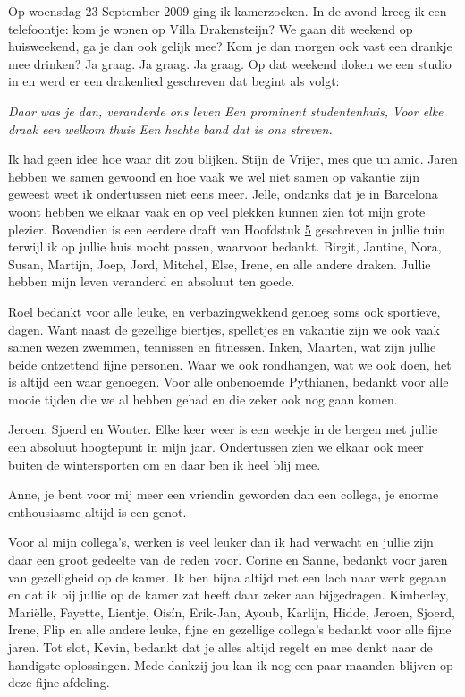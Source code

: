 \documentclass[openright,titlepage,12pt,a4paper]{book}
\begin{document}
\newpage

Op woensdag 23 September 2009 ging ik kamerzoeken. In de avond kreeg ik een telefoontje: kom je wonen op Villa Drakensteijn? We gaan dit weekend op huisweekend, ga je dan ook gelijk mee? Kom je dan morgen ook vast een drankje mee drinken? Ja graag. Ja graag. Ja graag. Op dat weekend doken we een studio in en werd er een drakenlied geschreven dat begint als volgt:

\emph{Daar was je dan, veranderde ons leven} \newline
\emph{Een prominent studentenhuis,} \newline
\emph{Voor elke draak een welkom thuis} \newline
\emph{Een hechte band dat is ons streven.}

Ik had geen idee hoe waar dit zou blijken. Stijn de Vrijer, mes que un amic. Jaren hebben we samen gewoond en hoe vaak we wel niet samen op vakantie zijn geweest weet ik ondertussen niet eens meer. Jelle, ondanks dat je in Barcelona woont hebben we elkaar vaak en op veel plekken kunnen zien tot mijn grote plezier. Bovendien is een eerdere draft van Hoofdstuk \protect\hyperlink{Burns}{5} geschreven in jullie tuin terwijl ik op jullie huis mocht passen, waarvoor bedankt. Birgit, Jantine, Nora, Susan, Martijn, Joep, Jord, Mitchel, Else, Irene, en alle andere draken. Jullie hebben mijn leven veranderd en absoluut ten goede.

Roel bedankt voor alle leuke, en verbazingwekkend genoeg soms ook sportieve, dagen. Want naast de gezellige biertjes, spelletjes en vakantie zijn we ook vaak samen wezen zwemmen, tennissen en fitnessen. Inken, Maarten, wat zijn jullie beide ontzettend fijne personen. Waar we ook rondhangen, wat we ook doen, het is altijd een waar genoegen. Voor alle onbenoemde Pythianen, bedankt voor alle mooie tijden die we al hebben gehad en die zeker ook nog gaan komen.

Jeroen, Sjoerd en Wouter. Elke keer weer is een weekje in de bergen met jullie een absoluut hoogtepunt in mijn jaar. Ondertussen zien we elkaar ook meer buiten de wintersporten om en daar ben ik heel blij mee.

Anne, je bent voor mij meer een vriendin geworden dan een collega, je enorme enthousiasme altijd is een genot.

Voor al mijn collega's, werken is veel leuker dan ik had verwacht en jullie zijn daar een groot gedeelte van de reden voor. Corine en Sanne, bedankt voor jaren van gezelligheid op de kamer. Ik ben bijna altijd met een lach naar werk gegaan en dat ik bij jullie op de kamer zat heeft daar zeker aan bijgedragen. Kimberley, Mariëlle, Fayette, Lientje, Oisín, Erik-Jan, Ayoub, Karlijn, Hidde, Jeroen, Sjoerd, Irene, Flip en alle andere leuke, fijne en gezellige collega's bedankt voor alle fijne jaren. Tot slot, Kevin, bedankt dat je alles altijd regelt en mee denkt naar de handigste oplossingen. Mede dankzij jou kan ik nog een paar maanden blijven op deze fijne afdeling.
\end{document}
